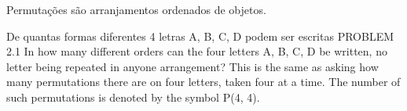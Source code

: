 Permutações são arranjamentos ordenados de objetos.

De quantas formas diferentes 4 letras A, B, C, D podem ser escritas 
PROBLEM 2.1 In how many different orders can the four letters
A, B, C, D be written, no letter being repeated in anyone
arrangement?
This is the same as asking how many permutations there are on
four letters, taken four at a time. The number of such permutations
is denoted by the symbol P(4, 4).
